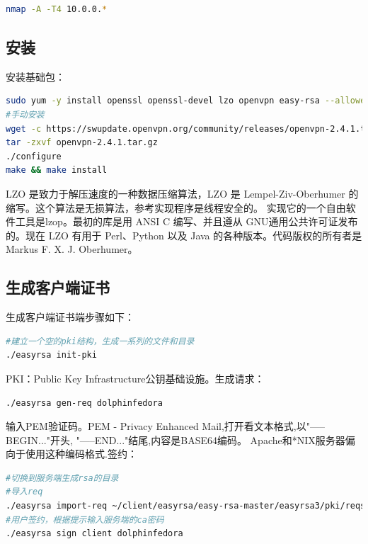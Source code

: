 \documentclass[letter]{book}
\begin{document}
\begin{lstlisting}[language=bash]
nmap -A -T4 10.0.0.*
\end{lstlisting}

\subsection{安装}

安装基础包：

\begin{lstlisting}[language=bash]
sudo yum -y install openssl openssl-devel lzo openvpn easy-rsa --allowerasing
#手动安装
wget -c https://swupdate.openvpn.org/community/releases/openvpn-2.4.1.tar.gz
tar -zxvf openvpn-2.4.1.tar.gz
./configure
make && make install
\end{lstlisting}

LZO 是致力于解压速度的一种数据压缩算法，LZO 是 Lempel-Ziv-Oberhumer 的缩写。这个算法是无损算法，参考实现程序是线程安全的。 实现它的一个自由软件工具是lzop。最初的库是用 ANSI C 编写、并且遵从 GNU通用公共许可证发布的。现在 LZO 有用于 Perl、Python 以及 Java 的各种版本。代码版权的所有者是 Markus F. X. J. Oberhumer。

\subsection{生成客户端证书}

生成客户端证书端步骤如下：

\begin{lstlisting}[language=Bash]
#建立一个空的pki结构，生成一系列的文件和目录
./easyrsa init-pki
\end{lstlisting}

PKI：Public Key Infrastructure公钥基础设施。生成请求：

\begin{lstlisting}[language=Bash]
./easyrsa gen-req dolphinfedora
\end{lstlisting}

输入PEM验证码。PEM - Privacy Enhanced Mail,打开看文本格式,以"-----BEGIN..."开头, "-----END..."结尾,内容是BASE64编码。
Apache和*NIX服务器偏向于使用这种编码格式.签约：

\begin{lstlisting}[language=Bash]
#切换到服务端生成rsa的目录
#导入req
./easyrsa import-req ~/client/easyrsa/easy-rsa-master/easyrsa3/pki/reqs/dolphinfedora.req dolphinfedora
#用户签约，根据提示输入服务端的ca密码
./easyrsa sign client dolphinfedora
\end{lstlisting}
\end{document}
